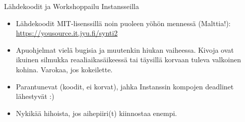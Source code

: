 \documentclass{beamer}
\begin{document}
\begin{frame}{Lähdekoodit ja Workshoppailu Instansseilla}
  \begin{itemize}
  \item Lähdekoodit MIT-lisenssillä noin puoleen yöhön mennessä
    (Malttia!): \url{https://yousource.it.jyu.fi/synti2}
  \item Apuohjelmat vielä bugisia ja muutenkin hiukan
    vaiheessa. Kivoja ovat ikuinen silmukka reaaliaikasäikeessä tai
    täysillä korvaan tuleva valkoinen kohina. Varokaa, jos kokeilette.
  \item Parantunevat (koodit, ei korvat), jahka Instanssin kompojen
    deadlinet lähestyvät :)
  \item Nykikää hihoista, jos aihepiiri(t) kiinnostaa enempi.
  \end{itemize}
\end{frame}
\end{document}

